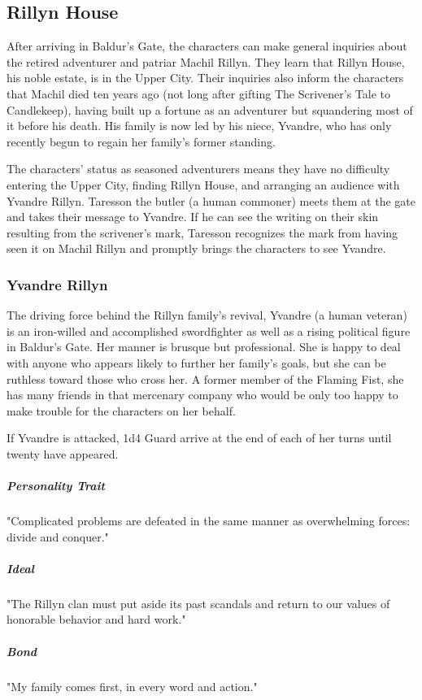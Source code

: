 \documentclass[10pt,a4paper,twoside,bg=print,twocolumn,openany,nodeprecatedcode]{dndbook}
\begin{document}
\subsection{Rillyn House}
After arriving in Baldur's Gate, the characters can make general inquiries about the retired adventurer and patriar Machil Rillyn. They learn that Rillyn House, his noble estate, is in the Upper City. Their inquiries also inform the characters that Machil died ten years ago (not long after gifting The Scrivener's Tale to Candlekeep), having built up a fortune as an adventurer but squandering most of it before his death. His family is now led by his niece, Yvandre, who has only recently begun to regain her family's former standing.

The characters' status as seasoned adventurers means they have no difficulty entering the Upper City, finding Rillyn House, and arranging an audience with Yvandre Rillyn. Taresson the butler (a human commoner) meets them at the gate and takes their message to Yvandre. If he can see the writing on their skin resulting from the scrivener's mark, Taresson recognizes the mark from having seen it on Machil Rillyn and promptly brings the characters to see Yvandre.

\subsubsection{Yvandre Rillyn}
The driving force behind the Rillyn family's revival, Yvandre (a human veteran) is an iron-willed and accomplished swordfighter as well as a rising political figure in Baldur's Gate. Her manner is brusque but professional. She is happy to deal with anyone who appears likely to further her family's goals, but she can be ruthless toward those who cross her. A former member of the Flaming Fist, she has many friends in that mercenary company who would be only too happy to make trouble for the characters on her behalf.

If Yvandre is attacked, 1d4 Guard arrive at the end of each of her turns until twenty have appeared.

\subparagraph{Personality Trait}
"Complicated problems are defeated in the same manner as overwhelming forces: divide and conquer."

\subparagraph{Ideal}
"The Rillyn clan must put aside its past scandals and return to our values of honorable behavior and hard work."

\subparagraph{Bond}
"My family comes first, in every word and action."
\end{document}
